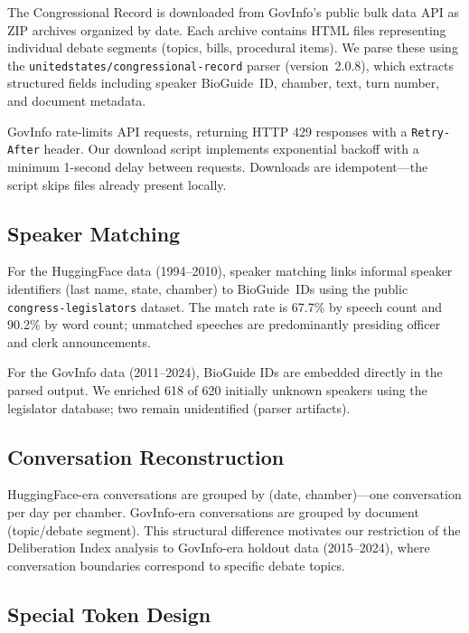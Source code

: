 \documentclass[12pt]{article}
\begin{document}
The Congressional Record is downloaded from GovInfo's public bulk data API as ZIP archives organized by date. Each archive contains HTML files representing individual debate segments (topics, bills, procedural items). We parse these using the \texttt{unitedstates/\allowbreak{}congressional-record} parser (version~2.0.8), which extracts structured fields including speaker BioGuide~ID, chamber, text, turn number, and document metadata.

GovInfo rate-limits API requests, returning HTTP 429 responses with a \texttt{Retry-After} header. Our download script implements exponential backoff with a minimum 1-second delay between requests. Downloads are idempotent---the script skips files already present locally.

\subsection{Speaker Matching}

{ For the HuggingFace data (1994--2010), speaker matching links informal speaker identifiers (last name, state, chamber) to BioGuide~IDs using the public \texttt{congress-legislators} dataset. The match rate is 67.7\% by speech count and 90.2\% by word count; unmatched speeches are predominantly presiding officer and clerk announcements.\par}

For the GovInfo data (2011--2024), BioGuide IDs are embedded directly in the parsed output. We enriched 618 of 620 initially unknown speakers using the legislator database; two remain unidentified (parser artifacts).

\subsection{Conversation Reconstruction}

HuggingFace-era conversations are grouped by (date, chamber)---one conversation per day per chamber. GovInfo-era conversations are grouped by document (topic/debate segment). This structural difference motivates our restriction of the Deliberation Index analysis to GovInfo-era holdout data (2015--2024), where conversation boundaries correspond to specific debate topics.

\subsection{Special Token Design}
\end{document}
